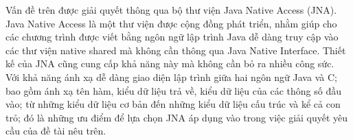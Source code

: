 Vấn đề trên được giải quyết thông qua bộ thư viện Java Native Access (JNA).\\

Java Native Access là một thư viện được cộng đồng phát triển, nhằm giúp cho các chương trình được viết bằng ngôn ngữ lập trình Java dễ dàng truy cập vào các thư viện native shared mà không cần thông qua Java Native Interface. Thiết kế của JNA cũng cung cấp khả năng này mà không cần bỏ ra nhiều công sức.\\

Với khả năng ánh xạ dễ dàng giao diện lập trình giữa hai ngôn ngữ Java và C; bao gồm ánh xạ tên hàm, kiểu dữ liệu trả về, kiểu dữ liệu của các thông số đầu vào; từ những kiểu dữ liệu cơ bản đến những kiểu dữ liệu cấu trúc và kể cả con trỏ; đó là những ưu điểm để lựa chọn JNA áp dụng vào trong việc giải quyết yêu cầu của đề tài nêu trên.